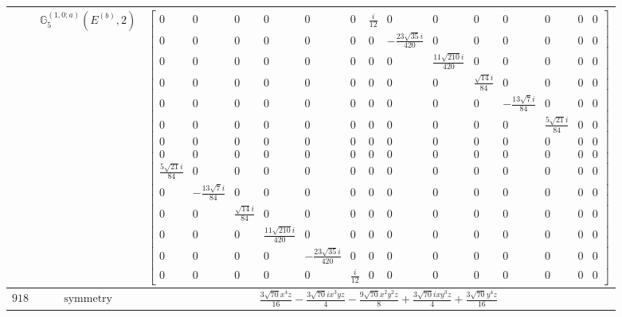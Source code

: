 \documentclass[fleqn,8pt,landscape]{jsarticle}
\begin{document}
\begin{longtable}{ccc}
$  $ & $ \mathbb{G}_{5}^{(1,0;a)}(E^{(b)},2) $ & $ \begin{bmatrix} 0 & 0 & 0 & 0 & 0 & 0 & \frac{i}{12} & 0 & 0 & 0 & 0 & 0 & 0 & 0 \\ 0 & 0 & 0 & 0 & 0 & 0 & 0 & - \frac{23 \sqrt{35} i}{420} & 0 & 0 & 0 & 0 & 0 & 0 \\ 0 & 0 & 0 & 0 & 0 & 0 & 0 & 0 & \frac{11 \sqrt{210} i}{420} & 0 & 0 & 0 & 0 & 0 \\ 0 & 0 & 0 & 0 & 0 & 0 & 0 & 0 & 0 & \frac{\sqrt{14} i}{84} & 0 & 0 & 0 & 0 \\ 0 & 0 & 0 & 0 & 0 & 0 & 0 & 0 & 0 & 0 & - \frac{13 \sqrt{7} i}{84} & 0 & 0 & 0 \\ 0 & 0 & 0 & 0 & 0 & 0 & 0 & 0 & 0 & 0 & 0 & \frac{5 \sqrt{21} i}{84} & 0 & 0 \\ 0 & 0 & 0 & 0 & 0 & 0 & 0 & 0 & 0 & 0 & 0 & 0 & 0 & 0 \\ 0 & 0 & 0 & 0 & 0 & 0 & 0 & 0 & 0 & 0 & 0 & 0 & 0 & 0 \\ \frac{5 \sqrt{21} i}{84} & 0 & 0 & 0 & 0 & 0 & 0 & 0 & 0 & 0 & 0 & 0 & 0 & 0 \\ 0 & - \frac{13 \sqrt{7} i}{84} & 0 & 0 & 0 & 0 & 0 & 0 & 0 & 0 & 0 & 0 & 0 & 0 \\ 0 & 0 & \frac{\sqrt{14} i}{84} & 0 & 0 & 0 & 0 & 0 & 0 & 0 & 0 & 0 & 0 & 0 \\ 0 & 0 & 0 & \frac{11 \sqrt{210} i}{420} & 0 & 0 & 0 & 0 & 0 & 0 & 0 & 0 & 0 & 0 \\ 0 & 0 & 0 & 0 & - \frac{23 \sqrt{35} i}{420} & 0 & 0 & 0 & 0 & 0 & 0 & 0 & 0 & 0 \\ 0 & 0 & 0 & 0 & 0 & \frac{i}{12} & 0 & 0 & 0 & 0 & 0 & 0 & 0 & 0 \end{bmatrix} $ \\ \hline
$ 918 $ & $ \text{symmetry} $ & $ \frac{3 \sqrt{70} x^{4} z}{16} - \frac{3 \sqrt{70} i x^{3} y z}{4} - \frac{9 \sqrt{70} x^{2} y^{2} z}{8} + \frac{3 \sqrt{70} i x y^{3} z}{4} + \frac{3 \sqrt{70} y^{4} z}{16} $ \\

\end{longtable}
\end{document}
